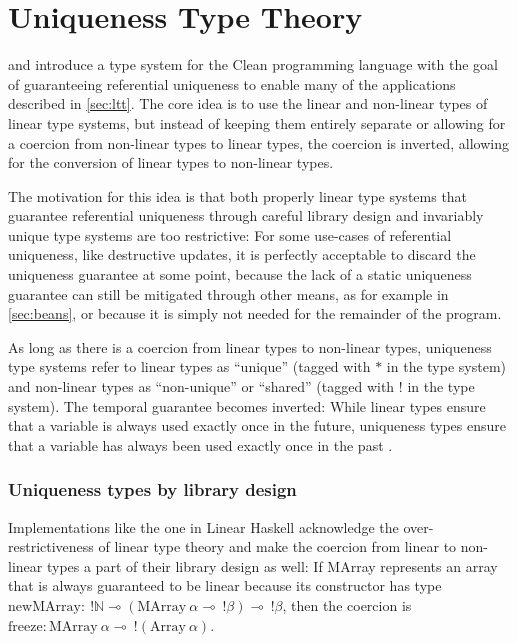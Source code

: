 \section{Uniqueness Type Theory}\label{sec:uniqueness}
\cite{smetsers_guaranteeing_1994} and \cite{barendsen_uniqueness_1996} introduce a type system for the Clean programming language with the goal of guaranteeing referential uniqueness to enable many of the applications described in \cref{sec:ltt}. The core idea is to use the linear and non-linear types of linear type systems, but instead of keeping them entirely separate or allowing for a coercion from non-linear types to linear types, the coercion is inverted, allowing for the conversion of linear types to non-linear types. 

The motivation for this idea is that both properly linear type systems that guarantee referential uniqueness through careful library design and invariably unique type systems are too restrictive: For some use-cases of referential uniqueness, like destructive updates, it is perfectly acceptable to discard the uniqueness guarantee at some point, because the lack of a static uniqueness guarantee can still be mitigated through other means, as for example in \cref{sec:beans}, or because it is simply not needed for the remainder of the program. 

As long as there is a coercion from linear types to non-linear types, uniqueness type systems refer to linear types as ``unique'' (tagged with $*$ in the type system) and non-linear types as ``non-unique'' or ``shared'' (tagged with $!$ in the type system). The temporal guarantee becomes inverted: While linear types ensure that a variable is always used exactly once in the future, uniqueness types ensure that a variable has always been used exactly once in the past \citep{de_vries_making_2009}\citep{sergey_linearity_2022}.

\subsubsection{Uniqueness types by library design}
Implementations like the one in Linear Haskell \citep{bernardy_linear_2018} acknowledge the over-restrictiveness of linear type theory and make the coercion from linear to non-linear types a part of their library design as well: If MArray represents an array that is always guaranteed to be linear because its constructor has type $\mathrm{newMArray} :\ !\mathbb{N} \multimap (\mathrm{MArray}\ \alpha \multimap\ !\beta) \multimap\ !\beta$, then the coercion is $\mathrm{freeze} : \mathrm{MArray}\ \alpha \multimap\ !(\mathrm{Array}\ \alpha)$. 

